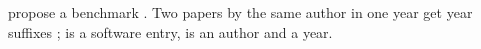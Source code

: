 \citet{doe2024:agents/v2} propose a benchmark \citep[see][p.~5]{openai2024}.
Two papers by the same author in one year get year suffixes
\citep{smith2020a,smith2020b}; \citealp{gmtool} is a software entry,
\citeauthor{lamport1994} is an author and \citeyearpar{knuth1984} a year.
\nocite{gm-unpublished}
